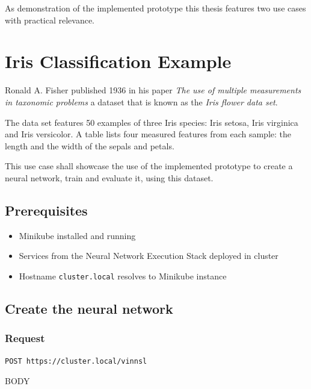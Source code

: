 As demonstration of the implemented prototype this thesis features two
use cases with practical relevance.

\section{Iris Classification Example}\label{iris-classification-example}

Ronald A. Fisher published 1936 in his paper \emph{The use of multiple
measurements in taxonomic problems} \cite{fisher} a dataset that is
known as the \emph{Iris flower data set}.

The data set \cite{fisher} features 50 examples of three Iris species:
Iris setosa, Iris virginica and Iris versicolor. A table lists four
measured features from each sample: the length and the width of the
sepals and petals.

This use case shall showcase the use of the implemented prototype to
create a neural network, train and evaluate it, using this dataset.

\subsection{Prerequisites}\label{prerequisites}

\begin{itemize}
\tightlist
\item
  Minikube installed and running
\item
  Services from the Neural Network Execution Stack deployed in cluster
\item
  Hostname \texttt{cluster.local} resolves to Minikube instance
\end{itemize}

\subsection{Create the neural network}\label{create-the-neural-network}

\subsubsection{Request}\label{request}

\begin{verbatim}
POST https://cluster.local/vinnsl
\end{verbatim}

BODY

